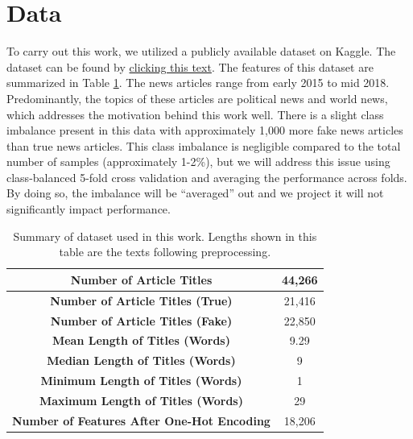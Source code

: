 \documentclass[12pt]{article}
\begin{document}
    \section{Data}
    
    To carry out this work, we utilized a publicly available dataset on Kaggle. The dataset can be found by \href{https://www.kaggle.com/clmentbisaillon/fake-and-real-news-dataset}{clicking this text}. The features of this dataset are summarized in Table \ref{table:1}. The news articles range from early 2015 to mid 2018. Predominantly, the topics of these articles are political news and world news, which addresses the motivation behind this work well. There is a slight class imbalance present in this data with approximately 1,000 more fake news articles than true news articles. This class imbalance is negligible compared to the total number of samples (approximately 1-2\%), but we will address this issue using class-balanced 5-fold cross validation and averaging the performance across folds. By doing so, the imbalance will be ``averaged'' out and we project it will not significantly impact performance. 

    \begin{table}
    \begin{center}
        \begin{tabular}{|c|c|}
            \hline
            \textbf{Number of Article Titles}&44,266\\
            \hline
            \textbf{Number of Article Titles (True)}&21,416\\
            \hline
            \textbf{Number of Article Titles (Fake)}&22,850\\
            \hline
            \textbf{Mean Length of Titles (Words)}&9.29\\
            \hline
            \textbf{Median Length of Titles (Words)}&9\\
            \hline
            \textbf{Minimum Length of Titles (Words)}&1\\
            \hline
            \textbf{Maximum Length of Titles (Words)}&29\\
            \hline
            \textbf{Number of Features After One-Hot Encoding}&18,206\\
            \hline
        \end{tabular}
        \caption{Summary of dataset used in this work. Lengths shown in this table are the texts following preprocessing.}
        \label{table:1}
    \end{center}  
    \end{table} 	
    
\end{document}
